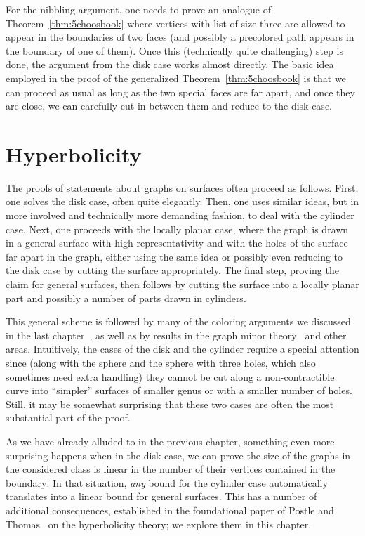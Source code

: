 \documentclass[12pt,twoside,openright,a4paper]{book}
\begin{document}
For the nibbling argument, one needs to prove an analogue of Theorem~\ref{thm:5choosbook} where vertices with list of size three
are allowed to appear in the boundaries of two faces (and possibly a precolored path appears in the boundary of one of them).
Once this (technically quite challenging) step is done, the argument from the disk case works almost directly.
The basic idea employed in the proof of the generalized Theorem~\ref{thm:5choosbook} is that we can proceed as usual
as long as the two special faces are far apart, and once they are close, we can carefully cut in between them and
reduce to the disk case.

\chapter{Hyperbolicity}\label{chap:hyper}

The proofs of statements about graphs on surfaces often proceed as follows. First, one solves the disk case,
often quite elegantly.  Then, one uses similar ideas, but in more involved and technically more demanding fashion,
to deal with the cylinder case.  Next, one proceeds with the locally planar case, where the graph is drawn in a general
surface with high representativity and with the holes of the surface far apart in the graph, either using the same idea
or possibly even reducing to the disk case by cutting the surface appropriately.  The final step, proving the claim
for general surfaces, then follows by cutting the surface into a locally planar part and possibly a number of parts
drawn in cylinders.

This general scheme is followed by many of the coloring arguments we discussed in the last chapter~\cite{Thomassen97,thomassen-surf,
trfree2,trfree3}, as well as by results in the graph minor theory~\cite{rs6,rs7} and other areas.  Intuitively,
the cases of the disk and the cylinder require a special attention since (along with the sphere and the sphere with three holes,
which also sometimes need extra handling) they cannot be cut along a non-contractible curve into ``simpler'' surfaces
of smaller genus or with a smaller number of holes.  Still, it may be somewhat surprising that these two cases are often
the most substantial part of the proof.

As we have already alluded to in the previous chapter, something even more surprising happens when
in the disk case, we can prove the size of the graphs in the considered class is linear in the number
of their vertices contained in the boundary: In that situation, \emph{any} bound for the cylinder case
automatically translates into a linear bound for general surfaces.  This has a number of additional consequences,
established in the foundational paper of Postle and Thomas~\cite{PosThoHyperb} on the hyperbolicity theory;
we explore them in this chapter.
\end{document}
